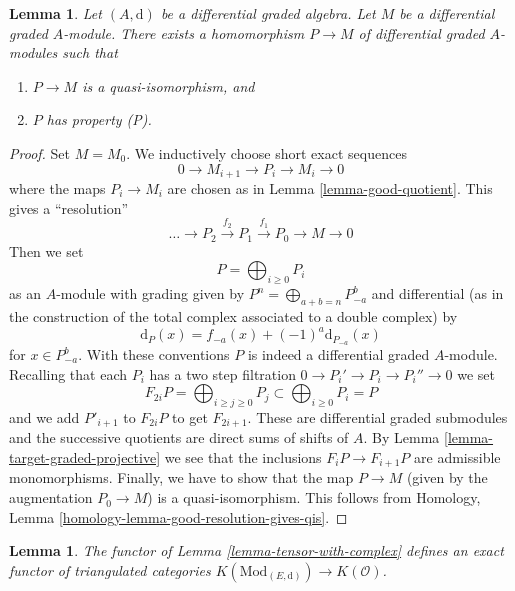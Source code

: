 \documentclass{stacks-project}
\theoremstyle{plain}
\newtheorem{lemma}[subsection]{Lemma}
\theoremstyle{definition}
\theoremstyle{remark}
\numberwithin{equation}{subsection}
\begin{document}
\begin{lemma}
\label{lemma-resolve}
Let $(A, \text{d})$ be a differential graded algebra.
Let $M$ be a differential graded $A$-module. There exists a homomorphism
$P \to M$ of differential graded $A$-modules such that
\begin{enumerate}
\item $P \to M$ is a quasi-isomorphism, and
\item $P$ has property (P).
\end{enumerate}
\end{lemma}

\begin{proof}
Set $M = M_0$. We inductively choose short exact sequences
$$
0 \to M_{i + 1} \to P_i \to M_i \to 0
$$
where the maps $P_i \to M_i$ are chosen as in Lemma \ref{lemma-good-quotient}.
This gives a ``resolution''
$$
\ldots \to P_2 \xrightarrow{f_2} P_1 \xrightarrow{f_1} P_0 \to M \to 0
$$
Then we set
$$
P = \bigoplus\nolimits_{i \geq 0} P_i
$$
as an $A$-module with grading given by
$P^n = \bigoplus_{a + b = n} P_{-a}^b$ and
differential (as in the construction of the total complex associated
to a double complex) by
$$
\text{d}_P(x) = f_{-a}(x) + (-1)^a \text{d}_{P_{-a}}(x)
$$
for $x \in P_{-a}^b$. With these conventions $P$ is indeed a differential
graded $A$-module. Recalling that each $P_i$ has a two step filtration
$0 \to P_i' \to P_i \to P_i'' \to 0$ we set
$$
F_{2i}P = \bigoplus\nolimits_{i \geq j \geq 0} P_j
\subset
\bigoplus\nolimits_{i \geq 0} P_i = P
$$
and we add $P'_{i + 1}$ to $F_{2i}P$ to get $F_{2i + 1}$.
These are differential graded submodules and the successive quotients
are direct sums of shifts of $A$. By
Lemma \ref{lemma-target-graded-projective} we see that
the inclusions $F_iP \to F_{i + 1}P$ are admissible monomorphisms.
Finally, we have to show that the map $P \to M$ (given by the
augmentation $P_0 \to M$) is a quasi-isomorphism. This follows from
Homology, Lemma \ref{homology-lemma-good-resolution-gives-qis}.
\end{proof}

\begin{lemma}
\label{lemma-tensor-with-complex-homotopy}
The functor of Lemma \ref{lemma-tensor-with-complex} defines an exact functor
of triangulated categories
$K(\text{Mod}_{(E, \text{d})}) \to K(\mathcal{O})$.
\end{lemma}
\end{document}
